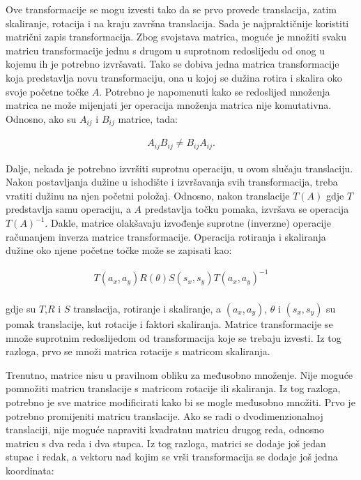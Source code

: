 \documentclass{foi}
\begin{document}
Ove transformacije se mogu izvesti tako da se prvo provede translacija, zatim skaliranje, rotacija i na kraju završna translacija. Sada je najpraktičnije koristiti matrični zapis transformacija. Zbog svojstava matrica, moguće je množiti svaku matricu transformacije jednu s drugom u suprotnom redoslijedu od onog u kojemu ih je potrebno izvršavati. Tako se dobiva jedna matrica transformacije koja predstavlja novu transformaciju, ona u kojoj se dužina rotira i skalira oko svoje početne točke $A$. Potrebno je napomenuti kako se redoslijed množenja matrica ne može mijenjati jer operacija množenja matrica nije komutativna. Odnosno, ako su $A_{ij}$ i $B_{ij}$ matrice, tada:

\begin{align*}
A_{ij}B_{ij}\neq B_{ij}A_{ij}.
\end{align*}

Dalje, nekada je potrebno izvršiti suprotnu operaciju, u ovom slučaju translaciju. Nakon postavljanja dužine u ishodište i izvršavanja svih transformacija, treba vratiti dužinu na njen početni položaj. Odnosno, nakon translacije $T(A)$ gdje $T$ predstavlja samu operaciju, a $A$ predstavlja točku pomaka, izvršava se operacija $T(A)^{-1}$. Dakle, matrice olakšavaju izvođenje suprotne (inverzne) operacije računanjem inverza matrice transformacije. Operacija rotiranja i skaliranja dužine oko njene početne točke može se zapisati kao:

\begin{align*}
T(a_x,a_y)R(\theta)S(s_x,s_y)T(a_x,a_y)^{-1}
\end{align*}\\
gdje su $T$,$R$ i $S$ translacija, rotiranje i skaliranje, a $(a_x, a_y)$, $\theta$ i $(s_x, s_y)$ su pomak translacije, kut rotacije i faktori skaliranja. Matrice transformacije se množe suprotnim redoslijedom od transformacija koje se trebaju izvesti. Iz tog razloga, prvo se množi matrica rotacije s matricom skaliranja. 

Trenutno, matrice nisu u pravilnom obliku za međusobno množenje. Nije moguće pomnožiti matricu translacije s matricom rotacije ili skaliranja. Iz tog razloga, potrebno je sve matrice modificirati kako bi se mogle međusobno množiti. Prvo je potrebno promijeniti matricu translacije. Ako se radi o dvodimenzionalnoj translaciji, nije moguće napraviti kvadratnu matricu drugog reda, odnosno matricu s dva reda i dva stupca. Iz tog razloga, matrici se dodaje još jedan stupac i redak, a vektoru nad kojim se vrši transformacija se dodaje još jedna koordinata:
\end{document}
